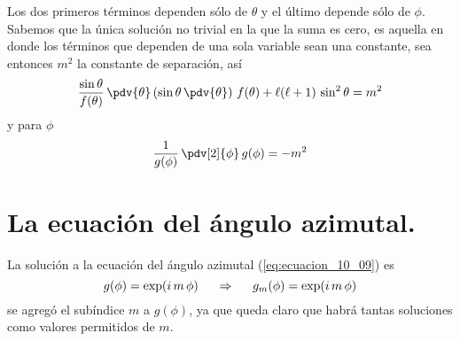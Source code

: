 Los dos primeros términos dependen sólo de $\theta$ y el último depende sólo de $\phi$. Sabemos que la única solución no trivial en la que la suma es cero, es aquella en donde los términos que dependen de una sola variable sean una constante, sea entonces $m^{2}$ la constante de separación, así
\begin{equation}
\dfrac{\sin \theta}{f(\theta)} \, \pdv{\theta} \left( \sin \theta \, \pdv{\theta} \right) \, f(\theta) + \ell (\ell + 1) \, \sin^{2} \theta = m^{2}
\label{eq:ecuacion_10_08}
\end{equation}
y para $\phi$
\begin{equation}
\dfrac{1}{g(\phi)} \, \pdv[2]{\phi} \, g(\phi) = -m^{2}
\label{eq:ecuacion_10_09}
\end{equation}
\section{La ecuación del ángulo azimutal.}
La solución a la ecuación del ángulo azimutal (\ref{eq:ecuacion_10_09}) es
\begin{equation}
g(\phi) = \exp(i \, m \, \phi) \hspace{0.5cm} \Rightarrow \hspace{0.5cm} g_{m} (\phi) = \exp(i \, m \, \phi)
\label{eq:ecuacion_10_10}
\end{equation}
se agregó el subíndice $m$ a $g(\phi)$, ya que queda claro que habrá tantas soluciones como valores permitidos de $m$.
